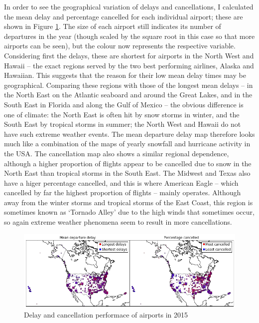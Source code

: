 \documentclass[a4paper]{article}
\begin{document}
In order to see the geographical variation of delays and cancellations, I calculated the mean delay and percentage cancelled for each individual airport; these are shown in Figure \ref{costairports}. The size of each airport still indicates its number of departures in the year (though scaled by the square root in this case so that more airports can be seen), but the colour now represents the respective variable. Considering first the delays, these are shortest for airports in the North West and Hawaii -- the exact regions served by the two best performing airlines, Alaska and Hawaiian. This suggests that the reason for their low mean delay times may be geographical. Comparing these regions with those of the longest mean delays -- in the North East on the Atlantic seaboard and around the Great Lakes, and in the South East in Florida and along the Gulf of Mexico -- the obvious difference is one of climate: the North East is often hit by snow storms in winter, and the South East by tropical storms in summer; the North West and Hawaii do not have such extreme weather events. The mean departure delay map therefore looks much like a combination of the maps of yearly snowfall\footnotemark[4] and hurricane activity\footnotemark[5] in the USA. The cancellation map also shows a similar regional dependence, although a higher proportion of flights appear to be cancelled due to snow in the North East than tropical storms in the South East. The Midwest and Texas also have a higer percentage cancelled, and this is where American Eagle -- which cancelled by far the highest proportion of flights -- mainly operates. Although away from the winter storms and tropical storms of the East Coast, this region is sometimes known as `Tornado Alley'\footnotemark[6] due to the high winds that sometimes occur, so again extreme weather phenomena seem to result in more cancellations.

\begin{figure}[h]
\centering
\includegraphics[width=1\textwidth]{../figures/exploration/cost_airports.png}
\caption{Delay and cancellation performace of airports in 2015}
\label{costairports}
\end{figure}
\end{document}
